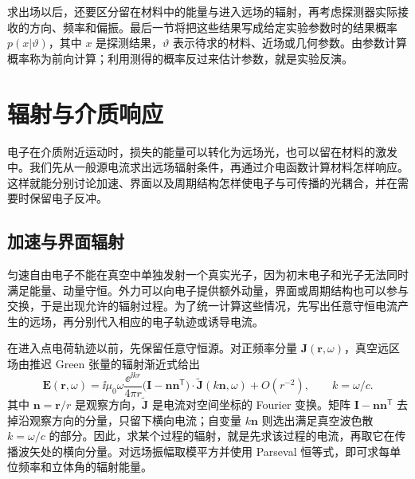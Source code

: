 求出场以后，还要区分留在材料中的能量与进入远场的辐射，再考虑探测器实际接收的方向、频率和偏振。最后一节将把这些结果写成给定实验参数时的结果概率 $p(x|\vartheta)$，其中 $x$ 是探测结果，$\vartheta$ 表示待求的材料、近场或几何参数。由参数计算概率称为前向计算；利用测得的概率反过来估计参数，就是实验反演。

\section{辐射与介质响应}

电子在介质附近运动时，损失的能量可以转化为远场光，也可以留在材料的激发中。我们先从一般源电流求出远场辐射条件，再通过介电函数计算材料怎样响应。这样就能分别讨论加速、界面以及周期结构怎样使电子与可传播的光耦合，并在需要时保留电子反冲。

\subsection{加速与界面辐射}

匀速自由电子不能在真空中单独发射一个真实光子，因为初末电子和光子无法同时满足能量、动量守恒。外力可以向电子提供额外动量，界面或周期结构也可以参与交换，于是出现允许的辐射过程。为了统一计算这些情况，先写出任意守恒电流产生的远场，再分别代入相应的电子轨迹或诱导电流。

在进入点电荷轨迹以前，先保留任意守恒源。对正频率分量 $\mathbf J(\mathbf r,\omega)$，真空远区场由推迟 Green 张量的辐射渐近式给出
\begin{equation}
\boxed{
\mathbf E(\mathbf r,\omega)
=
\ii\mu_0\omega\frac{\ee^{\ii k r}}{4\pi r}
\bigl(\mathbf I-\mathbf n\mathbf n^{\mathsf T}\bigr)
\cdot\widetilde{\mathbf J}(k\mathbf n,\omega)
+O(r^{-2}),
\qquad k=\omega/c.}
\label{eq:general_current_far_field_radiation}
\end{equation}
其中 $\mathbf n=\mathbf r/r$ 是观察方向，$\widetilde{\mathbf J}$ 是电流对空间坐标的 Fourier 变换。矩阵 $\mathbf I-\mathbf n\mathbf n^{\mathsf T}$ 去掉沿观察方向的分量，只留下横向电流；自变量 $k\mathbf n$ 则选出满足真空波色散 $k=\omega/c$ 的部分。因此，求某个过程的辐射，就是先求该过程的电流，再取它在传播波矢处的横向分量。对远场振幅取模平方并使用 Parseval 恒等式，即可求每单位频率和立体角的辐射能量。

